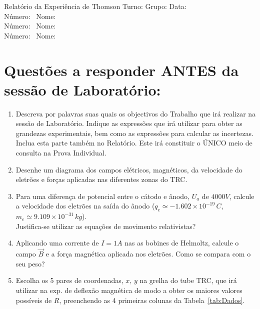 \documentclass[a4paper,12pt]{article}  %
\author{Prof. Bernardo B. Carvalho}
\date{ Outubro 2014}
\newcommand{\HRule}{\rule{\linewidth}{0.5mm}}
\begin{document}
 



{  \sf  Relatório da Experiência de Thomson} %
Turno:\underline{\makebox[1.5cm][l]{~}} Grupo:\underline{\makebox[1.5cm][l]{~}} Data:\underline{\makebox[1.5cm][l]{~}}\\
\noindent Número:~\underline{\makebox[2cm][r]{~}} Nome:~\underline{\makebox[10cm][r]{~}} \\
\noindent Número:~\underline{\makebox[2cm][r]{~}} Nome:~\underline{\makebox[10cm][r]{~}} \\
\noindent Número:~\underline{\makebox[2cm][r]{~}} Nome:~\underline{\makebox[10cm][r]{~}} 


\section{\sf Questões a responder ANTES da sessão de Laboratório:}
\begin{enumerate}
\item Descreva por palavras suas quais os objectivos do Trabalho que irá realizar na sessão de Laboratório. Indique as expressões que irá utilizar para obter as grandezas experimentais, bem como as expressões para calcular as incertezas. Inclua esta parte também no Relatório. Este irá constituir o ÚNICO meio de consulta na Prova Individual.
\item Desenhe um diagrama dos campos elétricos, magnéticos, da velocidade do eletrões e forças aplicadas nas diferentes zonas do TRC.
\item Para uma diferença de potencial entre o cátodo e ânodo, $U_a$  de $4000 V$, calcule a velocidade dos eletrões na saída do ânodo ($q_e \simeq  −1.602×10^{−19}\, C$, $m_e\simeq 9.109×10^{−31}\, kg$). \\
Justifica-se utilizar as equações de movimento relativistas?
\item Aplicando uma corrente de $I= 1A$ nas as bobines de Helmoltz, calcule o campo $\vec{B}$ e a força magnética aplicada nos eletrões. Como se compara com o seu peso? 
\item Escolha os 5 pares de coordenadas, $x,\, y$ na grelha  do tube TRC,  que irá utilizar na exp. de deflexão magnética de modo a obter os maiores valores possíveis de $R$, preenchendo as 4 primeiras colunas da Tabela~\ref{tab:Dados}.
\end{enumerate}
\end{document}
